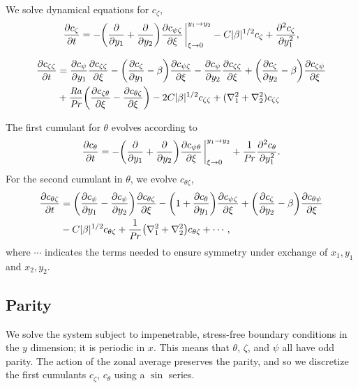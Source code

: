 \documentclass{jfm}
\newcommand{\cz}{c_{\zeta}}
\newcommand{\cs}{c_{\psi}}
\newcommand{\ct}{c_{\theta}}
\newcommand{\csz}{c_{\psi \zeta}}
\newcommand{\czs}{c_{\zeta \psi}}
\newcommand{\czz}{c_{\zeta \zeta}}
\newcommand{\ctz}{c_{\theta \zeta}}
\newcommand{\czt}{c_{\zeta \theta}}
\newcommand{\cst}{c_{\psi \theta}}
\newcommand{\cts}{c_{\theta \psi}}
\newcommand{\Ray}{\mbox{\textit{Ra}}}  %
\begin{document}
We solve dynamical equations for $\cz$,
\begin{equation}
  \label{eq:cz}
  \pdv{\cz}{t} = - \qty(\pdv{y_1} + \pdv{y_2}) \pdv{\csz}{\xi}\eval_{\xi \to 0}^{y_1 \to y_2} - C |\beta|^{1/2} \cz + \pdv[2]{\cz}{y_1},
\end{equation}

\begin{equation}
  \label{eq:czz}
  \begin{split}
    \pdv{\czz}{t} &= \pdv{\cs}{y_1} \pdv{\czz}{\xi} - \qty(\pdv{\cz}{y_1} - \beta) \pdv{\csz}{\xi} - \pdv{\cs}{y_2} \pdv{\czz}{\xi}  + \qty(\pdv{\cz}{y_2} - \beta) \pdv{\czs}{\xi}\\
    &+ \frac{\Ray}{\Pran} \qty(\pdv{\czt}{\xi} -  \pdv{\ctz}{\xi}) - 2C |\beta|^{1/2} \czz + (\nabla_1^2 + \nabla_2^2) \czz    
  \end{split}
\end{equation}

The first cumulant for $\theta$ evolves according to
\begin{equation}
  \label{eq:ct}
  \pdv{\ct}{t} = - \qty(\pdv{y_1} + \pdv{y_2}) \pdv{\cst}{\xi} \eval_{\xi \to 0}^{y_1 \to y_2} + \frac{1}{\Pran} \pdv[2]{\ct}{y_1}.
\end{equation}
For the second cumulant in $\theta$, we evolve $\ctz$,
\begin{equation}
  \label{eq:ctz}
  \begin{split}
    \pdv{\ctz}{t} &= \qty(\pdv{\cs}{y_1} - \pdv{\cs}{y_2}) \pdv{\ctz}{\xi} - \qty(1 + \pdv{\ct}{y_1}) \pdv{\csz}{\xi} + \qty(\pdv{\cz}{y_2} - \beta) \pdv{\cts}{\xi}\\
    &  - C |\beta|^{1/2} \ctz + \frac{1}{\Pran}\qty(\nabla_1^2 + \nabla_2^2) \ctz + \cdots,    
  \end{split}
\end{equation}
where $\cdots$ indicates the terms needed to ensure symmetry under exchange of $x_1, y_1$ and $x_2, y_2$.

\subsection{Parity}
\label{sec:parity}

We solve the system subject to impenetrable, stress-free boundary conditions in the $y$ dimension; it is periodic in $x$. 
This means that $\theta$, $\zeta$, and $\psi$ all have odd parity.
The action of the zonal average preserves the parity, and so we discretize the first cumulants $\cz$, $\ct$ using a $\sin$ series. 

% 
% 
\end{document}
